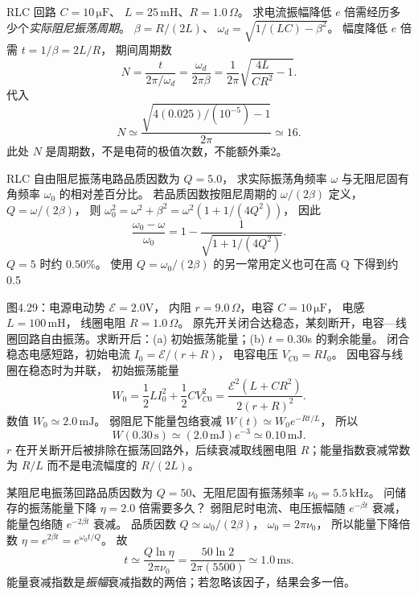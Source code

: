 RLC 回路 $C=10\,\mathrm{\mu F}$、
$L=25\,\mathrm{mH}$、$R=1.0\,\Omega$。
求电流振幅降低 $e$ 倍需经历多少个\emph{实际阻尼振荡周期}。
\exsolution
$\beta=R/(2L)$、
$\omega_d=\sqrt{1/(LC)-\beta^2}$。
幅度降低 $e$ 倍需 $t=1/\beta=2L/R$，
期间周期数
\[
N=\frac t{2\pi/\omega_d}
=\frac{\omega_d}{2\pi\beta}
=\frac1{2\pi}\sqrt{\frac{4L}{CR^2}-1}.
\]
代入
\[
\boxed{N\simeq
\frac{\sqrt{4(0.025)/(10^{-5})-1}}{2\pi}
\simeq16}.
\]
\excheck 此处 $N$ 是周期数，不是电荷的极值次数，不能额外乘2。

RLC 自由阻尼振荡电路品质因数为 $Q=5.0$，
求实际振荡角频率 $\omega$ 与无阻尼固有角频率 $\omega_0$ 的相对差百分比。
\exsolution
若品质因数按阻尼周期的 $\omega/(2\beta)$ 定义，
$Q=\omega/(2\beta)$，
则
$\omega_0^2=\omega^2+\beta^2
=\omega^2(1+1/(4Q^2))$，
因此
\[
\boxed{\frac{\omega_0-\omega}{\omega_0}
=1-\frac1{\sqrt{1+1/(4Q^2)}}}.
\]
$Q=5$ 时约
$\boxed{0.50\%}$。
\excheck 使用 $Q=\omega_0/(2\beta)$ 的另一常用定义也可在高 Q 下得到约0.5%

图4.29：电源电动势 $\mathcal E=2.0$V，
内阻 $r=9.0\,\Omega$，电容
$C=10\,\mathrm{\mu F}$，
电感 $L=100\,\mathrm{mH}$，
线圈电阻 $R=1.0\,\Omega$。
原先开关闭合达稳态，某刻断开，电容—线圈回路自由振荡。求断开后：(a) 初始振荡能量；(b) $t=0.30$s 的剩余能量。
\exsolution
闭合稳态电感短路，初始电流
$I_0=\mathcal E/(r+R)$，
电容电压 $V_{C0}=RI_0$。
因电容与线圈在稳态时为并联，
初始振荡能量
\[
W_0=\frac12LI_0^2+\frac12CV_{C0}^2
=\frac{\mathcal E^2(L+CR^2)}{2(r+R)^2}.
\]
数值
$\boxed{W_0\simeq2.0\,\mathrm{mJ}}$。
弱阻尼下能量包络衰减
$W(t)\simeq W_0e^{-Rt/L}$，
所以
\[
\boxed{W(0.30\,\mathrm s)\simeq
(2.0\,\mathrm{mJ})e^{-3}
\simeq0.10\,\mathrm{mJ}}.
\]
\excheck $r$ 在开关断开后被排除在振荡回路外，后续衰减取线圈电阻 $R$；能量指数衰减常数为 $R/L$ 而不是电流幅度的 $R/(2L)$。

某阻尼电振荡回路品质因数为 $Q=50$、无阻尼固有振荡频率
$\nu_0=5.5\,\mathrm{kHz}$。
问储存的振荡能量下降 $\eta=2.0$ 倍需要多久？
\exsolution
弱阻尼时电流、电压振幅随 $e^{-\beta t}$ 衰减，能量包络随 $e^{-2\beta t}$ 衰减。
品质因数 $Q\simeq\omega_0/(2\beta)$，
$\omega_0=2\pi\nu_0$，
所以能量下降倍数
$\eta=e^{2\beta t}=e^{\omega_0t/Q}$。
故
\[
\boxed{t\simeq\frac{Q\ln\eta}{2\pi\nu_0}
=\frac{50\ln2}{2\pi(5500)}
\simeq1.0\,\mathrm{ms}}.
\]
\excheck 能量衰减指数是\emph{振幅}衰减指数的两倍；若忽略该因子，结果会多一倍。

